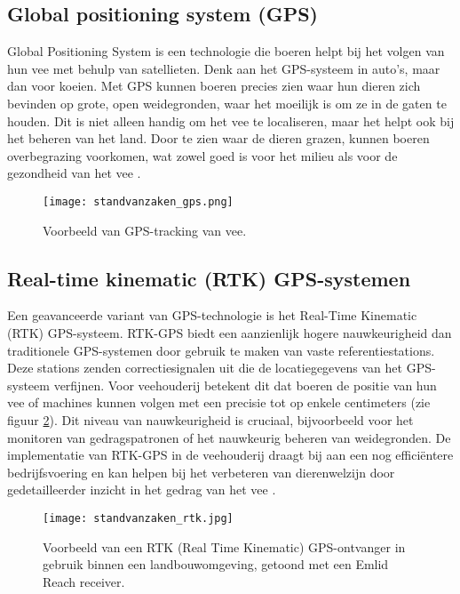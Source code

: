 \subsection{Global positioning system (GPS)}
Global Positioning System is een technologie die boeren helpt bij het volgen van hun vee met behulp van satellieten. 
Denk aan het GPS-systeem in auto's, maar dan voor koeien. Met GPS kunnen boeren precies zien waar hun dieren zich bevinden op grote, open weidegronden, waar het moeilijk is om ze in de gaten te houden. 
Dit is niet alleen handig om het vee te localiseren, maar het helpt ook bij het beheren van het land. Door te zien waar de dieren grazen, kunnen boeren overbegrazing voorkomen, wat zowel goed is voor het milieu als voor de gezondheid van het vee​​ \autocite{handcock2009monitoring}.
\begin{figure}[H]
  \centering
  \texttt{[image: standvanzaken\_gps.png]}
  \caption{Voorbeeld van GPS-tracking van vee. \cite{researchgate_cow_gps}}
  \label{fig:standvanzaken_gps}  
\end{figure}
\subsection{Real-time kinematic (RTK) GPS-systemen}
Een geavanceerde variant van GPS-technologie is het Real-Time Kinematic (RTK) GPS-systeem. RTK-GPS biedt een aanzienlijk hogere nauwkeurigheid dan traditionele GPS-systemen door gebruik te maken van vaste referentiestations. Deze stations zenden correctiesignalen uit die de locatiegegevens van het GPS-systeem verfijnen. Voor veehouderij betekent dit dat boeren de positie van hun vee of machines kunnen volgen met een precisie tot op enkele centimeters (zie figuur \ref{fig:standvanzaken_rtk}). Dit niveau van nauwkeurigheid is cruciaal, bijvoorbeeld voor het monitoren van gedragspatronen of het nauwkeurig beheren van weidegronden. De implementatie van RTK-GPS in de veehouderij draagt bij aan een nog efficiëntere bedrijfsvoering en kan helpen bij het verbeteren van dierenwelzijn door gedetailleerder inzicht in het gedrag van het vee \autocite{keshavarzi2021validation}.
\begin{figure}[H]
  \centering
  \texttt{[image: standvanzaken\_rtk.jpg]}
  \caption{Voorbeeld van een RTK (Real Time Kinematic) GPS-ontvanger in gebruik binnen een landbouwomgeving, getoond met een Emlid Reach receiver. \cite{emlid2019agrobot}}
  \label{fig:standvanzaken_rtk}  
\end{figure}
